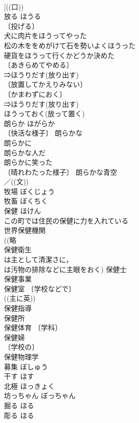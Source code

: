 \documentclass[8pt]{extreport}
\begin{document}
\begin{CJK}{UTF8}{min}
\\	[((口))
\\	放る	ほうる	
\\	〔投げる〕
\\	犬に肉片をほうってやった 
\\	松の木ををめがけて石を勢いよくほうった 
\\	硬貨をほうって行くかどうか決めた 
\\	〔あきらめてやめる〕
\\	⇒ほうりだす(放り出す)
\\	〔放置してかえりみない〕
\\	〔かまわずにおく〕
\\	⇒ほうりだす(放り出す)
\\	ほうっておく(放って置く)
\\	朗らか	ほがらか	
\\	〔快活な様子〕 朗らかな 
\\	朗らかに 
\\	朗らかな人だ 
\\	朗らかに笑った 
\\	〔晴れわたった様子〕 朗らかな青空 
\\	／((文)) 
\\	牧場	ぼくじょう	
\\	牧畜	ぼくちく	
\\	保健	ほけん	
\\	この町では住民の保健に力を入れている 
\\	世界保健機関 
\\	((略
\\	保健衛生 
\\	は主として清潔さに，
\\	は汚物の排除などに主眼をおく) 保健士 
\\	保健事業 
\\	保健室 〔学校などで〕
\\	((主に英)) 
\\	保健指導 
\\	保健所 
\\	保健体育 〔学科〕
\\	保健婦 
\\	〔学校の〕
\\	保健物理学 
\\	募集	ぼしゅう	
\\	干す	ほす	
\\	北極	ほっきょく	
\\	坊っちゃん	ぼっちゃん	
\\	掘る	ほる	
\\	彫る	ほる	

\end{CJK}
\end{document}
